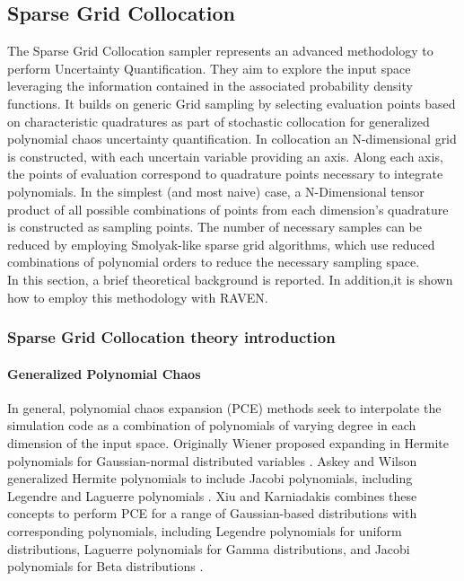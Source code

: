 
\subsection{Sparse Grid Collocation}
\label{sub:Stratified}
The Sparse Grid Collocation sampler represents an advanced methodology to perform Uncertainty Quantification. They aim
to explore the input space leveraging the information contained in the associated probability density functions. It builds on generic Grid sampling by selecting evaluation points based on characteristic quadratures as part of stochastic collocation for generalized polynomial chaos uncertainty quantification. In collocation an N-dimensional grid is constructed, with each uncertain variable providing an axis. Along each axis, the points of evaluation correspond to quadrature points necessary to integrate polynomials. In the simplest (and most naive) case, a N-Dimensional tensor product of all possible combinations of points from each dimension’s quadrature is constructed as sampling points. The number of necessary samples can be reduced by employing Smolyak-like sparse grid algorithms, which use reduced combinations of polynomial orders to reduce the necessary sampling space.
\\In this section, a brief theoretical 
background is reported. In addition,it is shown how to employ this methodology with RAVEN.
\subsubsection{Sparse Grid Collocation theory introduction}
\label{subsub:SGctheory}
\paragraph{Generalized Polynomial Chaos}
In general, polynomial chaos expansion (PCE) methods seek to interpolate the simulation code as a combination of
polynomials of varying degree in each dimension of the input space.  Originally Wiener
proposed expanding in Hermite polynomials for Gaussian-normal distributed variables \cite{wiener}.  Askey and
Wilson generalized Hermite polynomials to include Jacobi polynomials, including Legendre and Laguerre
polynomials \cite{Wiener-Askey}.  Xiu and Karniadakis combines these concepts to perform PCE for a range of Gaussian-based
distributions with corresponding polynomials,
including Legendre polynomials for uniform distributions, Laguerre polynomials for Gamma distributions, and
Jacobi polynomials for Beta distributions \cite{xiu}.

